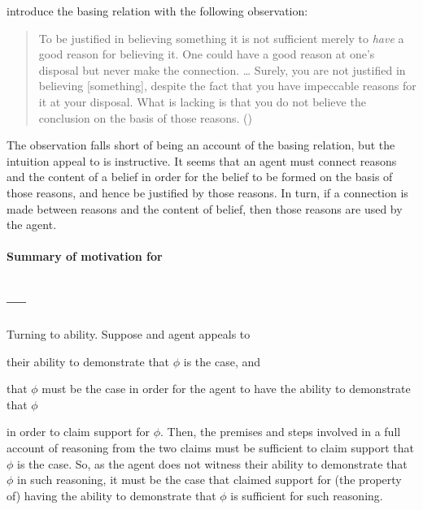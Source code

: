 \begin{note}
  \citeauthor{Pollock:1999tm} introduce the basing relation with the following observation:
  \begin{quote}
    To be justified in believing something it is not sufficient merely to \emph{have} a good reason for believing it.
    One could have a good reason at one's disposal but never make the connection.
    \dots
    Surely, you are not justified in believing [something], despite the fact that you have impeccable reasons for it at your disposal.
    What is lacking is that you do not believe the conclusion on the basis of those reasons.\linebreak
    \mbox{}\hfill\mbox{(\Citeyear[35]{Pollock:1999tm})}
  \end{quote}
  The observation falls short of being an account of the basing relation, but the intuition \citeauthor{Pollock:1999tm} appeal to is instructive.
  It seems that an agent must connect reasons and the content of a belief in order for the belief to be formed on the basis of those reasons, and hence be justified by those reasons.
  In turn, if a connection is made between reasons and the content of belief, then those reasons are used by the agent.
\end{note}


\paragraph{Summary of motivation for \ESU{}}



\subsection{ --- \EAS{}}
\label{sec:eas}

\begin{note}
  Turning to ability.
  Suppose and agent appeals to
  \begin{enumerate*}
  \item their ability to demonstrate that \(\phi\) is the case, and
  \item that \(\phi\) must be the case in order for the agent to have the ability to demonstrate that \(\phi\)
  \end{enumerate*}
  in order to claim support for \(\phi\).
  Then, the premises and steps involved in a full account of reasoning from the two claims must be sufficient to claim support that \(\phi\) is the case.
  So, as the agent does not witness their ability to demonstrate that \(\phi\) in such reasoning, it must be the case that claimed support for (the property of) having the ability to demonstrate that \(\phi\) is sufficient for such reasoning.
\end{note}


